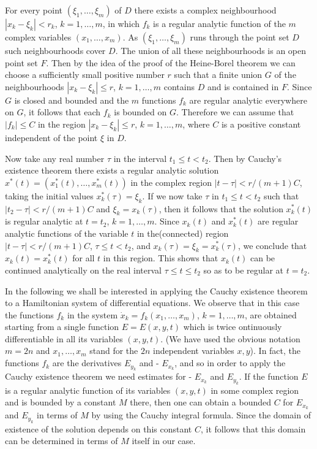 For every point $(\xi_1, \ldots, \xi_m)$ of $D$ there exists a complex neighbourhood $|x_k - \xi_k| < r_k$, $k =1 , \ldots, m$, in which $f_k$ is a regular analytic function of the $m$ complex variables $(x_1, \ldots, x_m)$. As $(\xi_1, \ldots, \xi_m)$ runs through the point set $D$ such neighbourhoods cover $D$. The union of all these neighbourhoods is an open point set $F$. Then by the idea of the proof of the Heine-Borel theorem we can choose a sufficiently small positive number $r$ such that a finite union $G$ of the neighbourhoods $|x_k - \xi_k| \leq r$, $k=1, \ldots, m$ contains $D$ and is contained in $F$. Since $G$ is closed and bounded and the $m$ functions $f_k$ are regular analytic everywhere on $G$, it follows that each $f_k$ is bounded on $G$. Therefore we can assume that $|f_k| \leq C$ in the region $|x_k - \xi_k| \leq r$, $k=1, \ldots, m$, where $C$ is a positive constant independent of the point $\xi$ in $D$.

Now take any real number $\tau$ in the interval $t_1 \leq t < t_2$. Then by Cauchy's existence theorem there exists a regular analytic solution $x^*(t) = (x^*_1(t), \ldots, x^*_m(t))$ in the complex region $|t-\tau| < r/ (m+1) C$, taking the initial values $x^*_k(\tau) = \xi_k$. If we now take $\tau$ in $t_1 \leq t < t_2$ such that $|t_2 -\tau| < r / (m+1) C$ and $\xi_k = x_k(\tau)$, then it follows that the solution $x^*_k(t)$ is regular analytic at $t=t_2$, $k =1 , \ldots, m$. Since $x_k(t)$ and $x^*_k(t)$ are regular analytic functions of the variable $t$ in the\pageoriginale (connected) region $|t-\tau| < r / (m+1) C$, $\tau \leq t < t_2$, and $x_k(\tau) = \xi_k = x^*_k(\tau)$, we conclude that $x_k(t) = x^*_k(t)$ for all $t$ in this region. This shows that $x_k(t)$ can be continued analytically on the real interval $\tau \leq t \leq t_2$ so as to be regular at $t = t_2$. 

In the following we shall be interested in applying the Cauchy existence theorem to a Hamiltonian system of differential equations. We observe that in this case the functions $f_k$ in the system $\dot{x}_k = f_k (x_1, \ldots, x_m)$, $k = 1, \ldots, m$, are obtained starting from a single function $E = E(x,y,t)$ which is twice ontinuously differentiable in all its variables $(x,y,t)$. (We have used the obvious notation $m=2n$ and $x_1, \ldots, x_m$ stand for the $2n$ independent variables $x,y$). In fact, the functions $f_k$ are the derivatives $E_{y_k}$ and - $E_{x_k}$, and so in order to apply the Cauchy existence theorem we need estimates for - $E_{x_k}$ and $E_{y_k}$. If the function $E$ is a regular analytic function of its variables $(x,y,t)$ in some complex region and is bounded by a constant $M$ there, then one can obtain a bounded $C$ for $E_{x_k}$ and $E_{y_k}$ in terms of $M$ by using the Cauchy integral formula. Since the domain of existence of the solution depends on this constant $C$, it follows that this domain can be determined in terms of $M$ itself in our case. 

